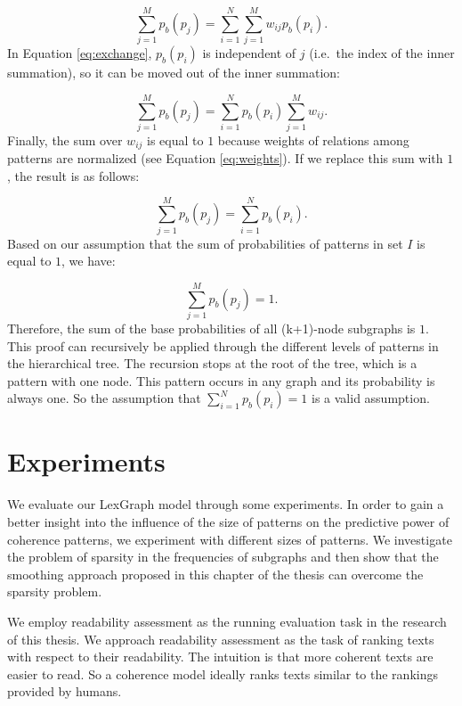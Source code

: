 \begin{equation}
\label{eq:exchange}
\sum_{j=1}^M p_b(p_j) = \sum_{i=1}^N \sum_{j=1}^M w_{ij}p_b(p_i).
\end{equation}
%
In Equation \ref{eq:exchange}, $p_b(p_i)$ is independent of $j$ (i.e.\ the index of the inner summation), so it can be moved out of the inner summation:

\begin{equation}
\sum_{j=1}^M p_b(p_j) = \sum_{i=1}^N p_b(p_i) \sum_{j=1}^M w_{ij}.
\end{equation}
%
Finally, the sum over $w_{ij}$ is equal to $1$ because weights of relations among patterns are normalized (see Equation \ref{eq:weights}).   
If we replace this sum with $1$, the result is as follows:

\begin{equation}
\sum_{j=1}^M p_b(p_j) = \sum_{i=1}^N p_b(p_i).
\end{equation}
%
Based on our assumption that the sum of probabilities of patterns in set $I$ is equal to $1$, we have: 

\begin{equation}
\sum_{j=1}^M p_b(p_j) = 1.
\end{equation}
%
Therefore, the sum of the base probabilities of all (k+1)-node subgraphs is $1$. 
This proof can recursively be applied through the different levels of patterns in the hierarchical tree. 
The recursion stops at the root of the tree, which is a pattern with one node. 
This pattern occurs in any graph and its probability is always one. 
So the assumption that $\sum_{i=1}^N p_b(p_i) = 1$ is a valid assumption. 
\QEDB

\section{Experiments}
\label{sec:lex-graph-results}

We evaluate our LexGraph model through some experiments.  
In order to gain a better insight into the influence of the size of patterns on the predictive power of coherence patterns, we experiment with different sizes of patterns. 
We investigate the problem of sparsity in the frequencies of subgraphs and then show that the smoothing approach proposed in this chapter of the thesis can overcome the sparsity problem. 

We employ readability assessment as the running evaluation task in the research of this thesis.
We approach readability assessment as the task of ranking texts with respect to their readability. 
The intuition is that more coherent texts are easier to
read.  
So a coherence model ideally ranks texts similar to the rankings provided by humans.  

